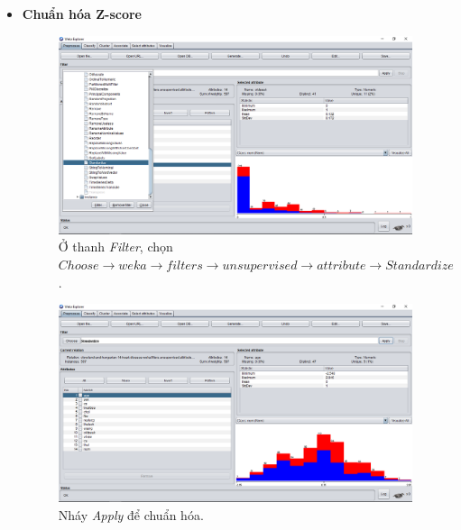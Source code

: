 \begin{itemize}
\item \textbf{Chuẩn hóa Z-score}
\begin{figure}[H]
\centering
\includegraphics[width=0.98\textwidth]{5/b3.png}
\caption{Ở thanh \textit{Filter}, chọn \textit{$Choose \rightarrow weka \rightarrow filters \rightarrow unsupervised \rightarrow attribute \rightarrow Standardize$}.}
\end{figure}

\begin{figure}[H]
\centering
\includegraphics[width=0.98\textwidth]{5/b4.png}
\caption{Nháy \textit{Apply} để chuẩn hóa.}
\end{figure}

\end{itemize}

